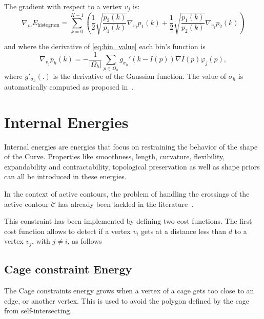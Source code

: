 The gradient with respect to a vertex $v_j$ is:
\begin{equation}
\nabla_{v_j} E_\mathrm{histogram} = 
\sum_{k=0}^{K-1} \left( \frac{1}{2} \sqrt{\frac{p_2(k)}{p_1(k)}} \nabla_{v_j} p_{1}(k)
+ \frac{1}{2} \sqrt{\frac{p_1(k)}{p_2(k)}} \nabla_{v_j} p_2(k) \right)
\end{equation}

and where the derivative of \eqref{eq:bin_value} each bin's function is
\begin{equation}
\nabla_{v_j} p_{h}(k) = - \frac{1}{|\Omega_h|}\sum_{p \in \Omega_h} g_{\sigma_h}' (k-I(p))\nabla I(p) \varphi_{j}(p),
\end{equation}
where $g'_{\sigma_h}(.)$ is the derivative of the Gaussian function. The value
of $\sigma_h$ is automatically computed as proposed in~\cite{Michailovich2007}.



\section{Internal Energies}

Internal energies are energies that focus on restraining the behavior of the shape of the Curve. Properties like smoothness, length, curvature, flexibility, expandability and contractability, topological preservation as well as shape priors can all be introduced in these energies.

 In the context of active contours, the problem of handling the crossings of the
active contour $\mathcal{C}$ has already been tackled in the
literature~\cite{Delingette2000}.

This constraint has been implemented by defining two cost functions. The first
cost function allows to detect if a vertex $v_i$ gets at a distance
less than $d$ to a vertex $v_j$, with $j\neq i$, as follows


\subsection{Cage constraint Energy}
\label{subsubsec:CageConstraint}
The Cage constraints energy grows when a vertex of a cage gets too close to an edge, or another vertex. This is used to avoid the polygon defined by the cage from self-intersecting.

